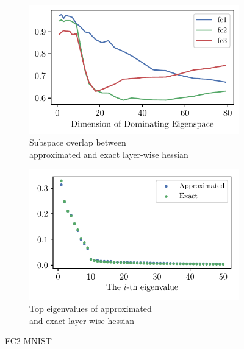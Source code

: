 \begin{figure}[th]
    \centering
    \begin{subfigure}[b]{0.495\textwidth}
        \centering
        \captionsetup{justification=centering}
        \includegraphics[width=\textwidth]{Figures/ApproxQuality/FC2_fixlr/sample_kron_decomp_traceoverlap_d80_MNIST_Exp1_FC2_fixlr0.01R2_E-1.pdf}
        \caption{Subspace overlap between\\ approximated and exact layer-wise hessian}
        \label{fig:overlap_approx}
    \end{subfigure}
    \hfill
    \begin{subfigure}[b]{0.495\textwidth}
        \centering
        \captionsetup{justification=centering}
        \includegraphics[width=\textwidth]{Figures/ApproxQuality/FC2_fixlr/eigenval_compare_top50_MNIST_Exp1_FC2_fixlr0.01R2_E-1_fc2.pdf}
        \caption{Top eigenvalues of approximated\\ and exact layer-wise hessian}
        \label{fig:eigenval_approx}
    \end{subfigure}
    \caption{FC2 MNIST }
    \label{fig:approx_result}
\end{figure}

